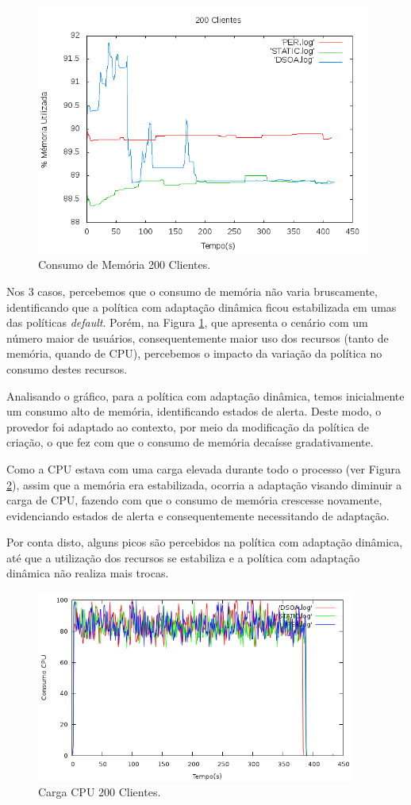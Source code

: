 \begin{figure}[htp]
\centering
\includegraphics[width=11cm]{chapters/chapter4/mem-200.png}
\caption[Consumo de Memória 200 Clientes]{Consumo de Memória 200 Clientes.}
\label{fig:200-cl}
\end{figure}
\newpage
Nos 3 casos, percebemos que o consumo de memória não varia bruscamente, identificando que a política com adaptação dinâmica ficou estabilizada em umas das políticas \textit{default}. Porém, na Figura \ref{fig:200-cl}, que apresenta o cenário com um número maior de usuários, consequentemente maior uso dos recursos (tanto de memória, quando de CPU), percebemos o impacto da variação da política no consumo destes recursos.

Analisando o gráfico, para a política com adaptação dinâmica, temos inicialmente um consumo alto de memória, identificando estados de alerta. Deste modo, o provedor foi adaptado ao contexto, por meio da modificação da política de criação, o que fez com que o consumo de memória decaísse gradativamente.

Como a CPU estava com uma carga elevada durante todo o processo (ver Figura \ref{fig:200-cpu}), assim que a memória era estabilizada, ocorria a adaptação visando diminuir a carga de CPU, fazendo com que o consumo de memória crescesse novamente, evidenciando estados de alerta e consequentemente necessitando de adaptação. 

Por conta disto, alguns picos são percebidos na política com adaptação dinâmica, até que a utilização dos recursos se estabiliza e a política com adaptação dinâmica não realiza mais trocas.


\begin{figure}[htp]
\centering
\includegraphics[width=10.5cm]{chapters/chapter4/cpu-200.png}
\caption[Carga CPU 200 Clientes]{Carga CPU 200 Clientes.}
\label{fig:200-cpu}
\end{figure}

